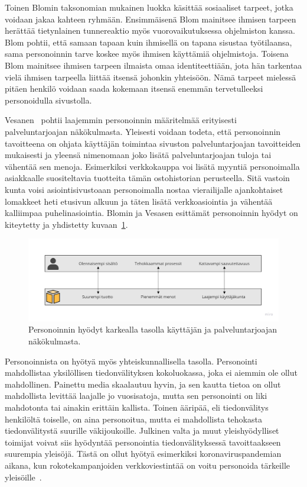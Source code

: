 \documentclass[finnish, 12pt, a4paper, elec, utf8, a-1b, online]{aaltothesis}
\begin{document}
Toinen Blomin taksonomian mukainen luokka käsittää sosiaaliset tarpeet, jotka
voidaan jakaa kahteen ryhmään. Ensimmäisenä Blom mainitsee ihmisen tarpeen
herättää tietynlainen tunnereaktio myös vuorovaikutuksessa ohjelmiston kanssa.
Blom pohtii, että samaan tapaan kuin ihmisellä on tapana sisustaa työtilaansa,
sama personoinnin tarve koskee myös ihmisen käyttämiä ohjelmistoja. Toisena Blom
mainitsee ihmisen tarpeen ilmaista omaa identiteettiään, jota hän tarkentaa
vielä ihmisen tarpeella liittää itsensä johonkin yhteisöön. Nämä tarpeet
mielessä pitäen henkilö voidaan saada kokemaan itsensä enemmän tervetulleeksi
personoidulla sivustolla.

Vesanen~\cite{10.1108/03090560710737534} pohtii laajemmin personoinnin
määritelmää erityisesti palveluntarjoajan näkökulmasta. Yleisesti voidaan
todeta, että personoinnin tavoitteena on ohjata käyttäjän toimintaa sivuston
palveluntarjoajan tavoitteiden mukaisesti ja yleensä nimenomaan joko lisätä
palveluntarjoajan tuloja tai vähentää sen menoja. Esimerkiksi verkkokauppa voi
lisätä myyntiä personoimalla asiakkaalle suositeltavia tuotteita tämän
ostohistorian perusteella. Sitä vastoin kunta voisi asiointisivustoaan
personoimalla nostaa vierailijalle ajankohtaiset lomakkeet heti etusivun alkuun
ja täten lisätä verkkoasiointia ja vähentää kalliimpaa puhelinasiointia. Blomin
ja Vesasen esittämät personoinnin hyödyt on kiteytetty ja yhdistetty
kuvaan~\ref{fig:personalization-benefits}.

\begin{figure}[h]
    \centering
    \includegraphics[width=\textwidth]{images/personalization-benefits.jpg}
    \caption{Personoinnin hyödyt karkealla tasolla käyttäjän ja
    palveluntarjoajan näkökulmasta.~\label{fig:personalization-benefits}}
\end{figure}

Personoinnista on hyötyä myös yhteiskunnallisella tasolla. Personointi
mahdollistaa yksilöllisen tiedonvälityksen kokoluokassa, joka ei aiemmin ole
ollut mahdollinen. Painettu media skaalautuu hyvin, ja sen kautta tietoa on
ollut mahdollista levittää laajalle jo vuosisatoja, mutta sen personointi on
liki mahdotonta tai ainakin erittäin kallista. Toinen ääripää, eli tiedonvälitys
henkilöltä toiselle, on aina personoitua, mutta ei mahdollista tehokasta
tiedonvälitystä suurille väkijoukoille. Julkinen valta ja muut yleishyödylliset
toimijat voivat siis hyödyntää personointia tiedonvälityksessä tavoittaakseen
suurempia yleisöjä. Tästä on ollut hyötyä esimerkiksi koronaviruspandemian
aikana, kun rokotekampanjoiden verkkoviestintää on voitu personoida tärkeille
yleisöille~\cite{sanchez_2022}.
\end{document}
